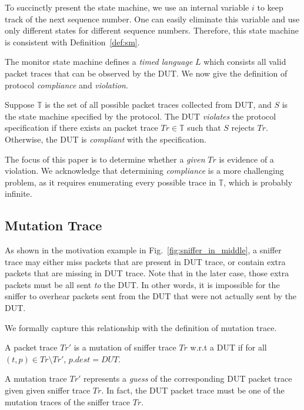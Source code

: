 To succinctly present the state machine, we use an internal variable $i$ to keep
track of the next sequence number.
One can easily eliminate this variable and
use only different states for different sequence numbers.
Therefore, this state machine is consistent with Definition~\ref{def:sm}.

The monitor state machine defines a \textit{timed language} $L$ which consists
all valid packet traces that can be observed by the DUT.  We now give the
definition of protocol \textit{compliance} and \textit{violation}.

\begin{definition}
  Suppose $\mathbb{T}$ is the set of all possible packet traces collected from
  DUT, and $S$ is the state machine specified by the protocol. The DUT
  \textit{violates} the protocol specification if there exists an
  packet trace $Tr \in \mathbb{T}$ such that $S$ rejects $Tr$.
  Otherwise, the DUT is \textit{compliant} with the specification.
\end{definition}

The focus of this paper is to determine whether a \textit{given} $Tr$ is
evidence of a violation.
%
We acknowledge that determining \textit{compliance} is a more challenging
problem, as it requires enumerating every possible trace in $\mathbb{T}$, which
is probably infinite.


\subsection{Mutation Trace}
\label{subsec:mutation}

As shown in the motivation example in Fig.~\ref{fig:sniffer_in_middle}, a
sniffer trace may either miss packets that are present in DUT trace, or contain
extra packets that are missing in DUT trace. Note that in the later case, those
extra packets must be all sent \textit{to} the DUT. In other words, it is
impossible for the sniffer to overhear packets sent from the DUT that were not
actually sent by the DUT.

We formally capture this relationship with the definition of mutation trace.

\begin{definition}
  \label{def:mutation}
  A packet trace $Tr'$ is a mutation of sniffer trace $Tr$ w.r.t a DUT if for
  all $(t, p) \in Tr\setminus Tr'$, $p.dest = DUT$.
\end{definition}

A mutation trace $Tr'$ represents a \textit{guess} of the corresponding DUT
packet trace given given sniffer trace $Tr$.  In fact, the DUT packet trace must
be one of the mutation traces of the sniffer trace $Tr$.

